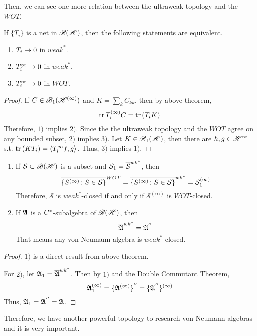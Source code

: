 Then, we can see one more relation between the ultraweak topology and the $WOT$.

\begin{thm}
	If $\{T_i\}$ is a net in $\mathscr{B(H)}$, then the following statements are equivalent.
	\begin{enumerate}[label = \arabic*)]
		\item $T_i \rightarrow 0$ in $weak^{*}$.
		\item $T_i^{\infty} \rightarrow 0$ in $weak^{*}$.
		\item $T_i^{\infty} \rightarrow 0$ in $WOT$.
	\end{enumerate}
\end{thm}
\begin{proof}
	If $C \in \mathscr{B}_1(\mathscr{H}^{(\infty)})$ and $K = \sum_k C_{kk}$, then by above theorem,
	\begin{equation*}
		\operatorname{tr}{T_i^{(\infty)}C} = \operatorname{tr}{(T_iK)}
	\end{equation*}
 	Therefore, $1)$ implies $2)$. Since the the ultraweak topology and the $WOT$ agree on any bounded subset, $2)$ implies $3)$. Let $K \in \mathscr{B}_{1}\mathscr{(H)}$, then there are $h,g \in \mathscr{H}^{\infty}$ s.t. $\operatorname{tr}{(KT_i)} = \langle T_i^{\infty}f,g \rangle$. Thus, $3)$ implies $1)$.
\end{proof}

\begin{cor}
	\begin{enumerate}[label=\arabic*)]
		\item If $\mathcal{S} \subset \mathscr{B(H)}$ is a subset and $\mathcal{S}_1 = \overline{\mathcal{S}}^{wk^{*}}$, then 
		\begin{equation*}
			\overline{\{S^{(\infty)} \colon S \in \mathcal{S}\}}^{WOT} = \overline{\{S^{(\infty)} \colon S \in \mathcal{S}\}}^{wk^{*}} = \mathcal{S}_1^{(\infty)}
		\end{equation*}
		Therefore, $\mathcal{S}$ is $weak^{*}$-closed if and only if $\mathcal{S}^{(\infty)}$ is $WOT$-closed.
		\item If $\mathfrak{A}$ is a $C^{*}$-subalgebra of $\mathscr{B(H)}$, then
		\begin{equation*}
			\overline{\mathfrak{A}}^{wk^{*}} = \mathfrak{A}^{''}
		\end{equation*}
		That means any von Neumann algebra is $weak^{*}$-closed.
	\end{enumerate}
\end{cor}
\begin{proof}
	$1)$ is a direct result from above theorem.
	\item For $2)$, let $\mathfrak{A}_1 = \overline{\mathfrak{A}}^{wk^{*}}$. Then by $1)$ and the Double Commutant Theorem,
	\begin{equation*}
		\mathfrak{A}_1^{(\infty)} = \{\mathfrak{A}^{(\infty)}\}^{''} = \{\mathfrak{A}^{''}\}^{(\infty)}
	\end{equation*}
	Thus, $\mathfrak{A}_1 = \mathfrak{A}^{''} = \mathfrak{A}$.
\end{proof}
\begin{rem}
	Therefore, we have another powerful topology to research von Neumann algebras and it is very important.
\end{rem}

